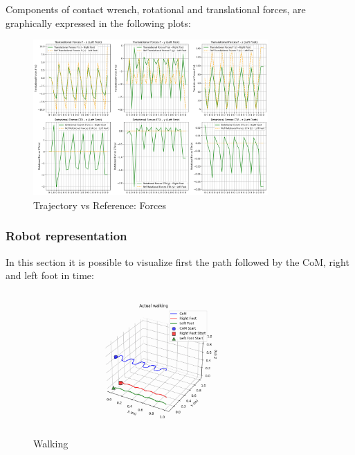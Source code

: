 \documentclass[main.tex]{subfiles}
\begin{document}
Components of contact wrench, rotational and translational forces, are graphically expressed in the following plots:
\begin{figure}[htbp]
    \centering
    \includegraphics[width=0.8\textwidth]{figures/contact_forces_walking.png}
    \caption{Trajectory vs Reference: Forces}
    \label{fig:contact_forces_walking}
\end{figure}

\newpage
\subsubsection*{Robot representation}
In this section it is possible to visualize first the path followed by the CoM, right and left foot in time:
\begin{figure}[htbp]
    \centering
    \includegraphics[width=0.8\textwidth]{figures/walking.PNG}
    \caption{Walking}
    \label{fig:walking}
\end{figure}
\end{document}
